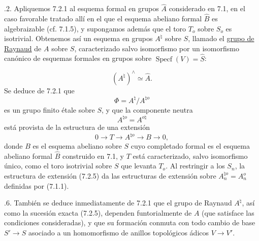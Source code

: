 
\medskip
{}.2. Apliquemos 7.2.1 al esquema formal en grupos $\widehat A$
considerado en 7.1, en el caso favorable tratado allí en el que el
esquema abeliano formal $\widehat B$ es algebraizable (cf. 7.1.5), y
supongamos además que el toro $T_o$ sobre $S_o$ es isotrivial. Obtenemos
así un esquema en grupos $A^\natural$ sobre $S$, llamado el
\underline{grupo de Raynaud} de $A$ sobre $S$, caracterizado salvo
isomorfismo por un isomorfismo canónico de esquemas formales en grupos
sobre $\operatorname{Specf}(V)=\widehat S$:


\begin{equation}\tag{7.2.3}
 (A^\natural)^\wedge\simeq\widehat A.
\end{equation}
Se deduce de 7.2.1 que
\begin{equation}\tag{7.2.4}
 \Phi=A^\natural/A^{\natural o}
\end{equation}
es un grupo finito étale sobre $S$, y que la componente neutra
\[
 A^{\natural o}=A^{o\natural}
\]
está provista de la estructura de una extensión
\begin{equation}\tag{7.2.5}
 0\longrightarrow T\longrightarrow A^{\natural o}
 \longrightarrow B\longrightarrow0,
\end{equation}
donde $B$ es el esquema abeliano sobre $S$ cuyo completado formal es el
esquema abeliano formal $\widehat B$ construido en 7.1, y $T$ está
caracterizado, salvo isomorfismo único, como el toro isotrivial sobre
$S$ que levanta $T_o$. Al restringir a los $S_n$, la estructura de
extensión (7.2.5) da las estructuras de extensión sobre
$A_n^{\natural o}=A_n^o$ definidas por (7.1.1).

\medskip
{}.6. También se deduce inmediatamente de 7.2.1 que el grupo de
Raynaud $A^\natural$, así como la sucesión exacta (7.2.5), dependen
funtorialmente de $A$ (que satisface las condiciones consideradas), y
que su formación conmuta con todo cambio de base $S'\longrightarrow S$
asociado a un homomorfismo de anillos topológicos ádicos
$V\longrightarrow V'$.
